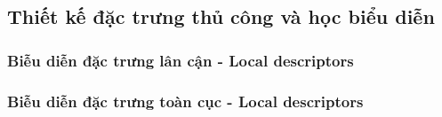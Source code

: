 \subsection{Thiết kế đặc trưng thủ công và học biểu diễn}

\subsubsection{Biễu diễn đặc trưng lân cận  - Local descriptors}

\subsubsection{Biễu diễn đặc trưng toàn cục  - Local descriptors}

